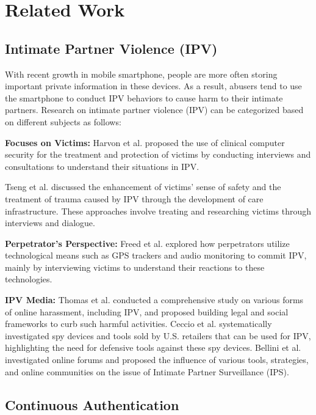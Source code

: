 \section{Related Work}\label{sec-7-related}
\subsection{Intimate Partner Violence (IPV)}
With recent growth in mobile smartphone, people are more often storing important private information in these devices. As a result, abusers tend to use the smartphone to conduct IPV behaviors to cause harm to their intimate partners. 
Research on intimate partner violence (IPV) can be categorized based on different subjects as follows:

\textbf{Focuses on Victims:} Harvon et al.\cite{havron2019clinical} proposed the use of clinical computer security for the treatment and protection of victims by conducting interviews and consultations to understand their situations in IPV.

Tseng et al.\cite{tseng2022care} discussed the enhancement of victims' sense of safety and the treatment of trauma caused by IPV through the development of care infrastructure. These approaches involve treating and researching victims through interviews and dialogue.

\textbf{Perpetrator's Perspective:} Freed et al.\cite{freed2018stalker} explored how perpetrators utilize technological means such as GPS trackers and audio monitoring to commit IPV, mainly by interviewing victims to understand their reactions to these technologies.

\textbf{IPV Media:} Thomas et al.\cite{thomas2021sok} conducted a comprehensive study on various forms of online harassment, including IPV, and proposed building legal and social frameworks to curb such harmful activities. Ceccio et al.\cite{ceccio2023sneaky} systematically investigated spy devices and tools sold by U.S. retailers that can be used for IPV, highlighting the need for defensive tools against these spy devices. Bellini et al.\cite{bellini2023digital} investigated online forums and proposed the influence of various tools, strategies, and online communities on the issue of Intimate Partner Surveillance (IPS).


\subsection{Continuous Authentication}

